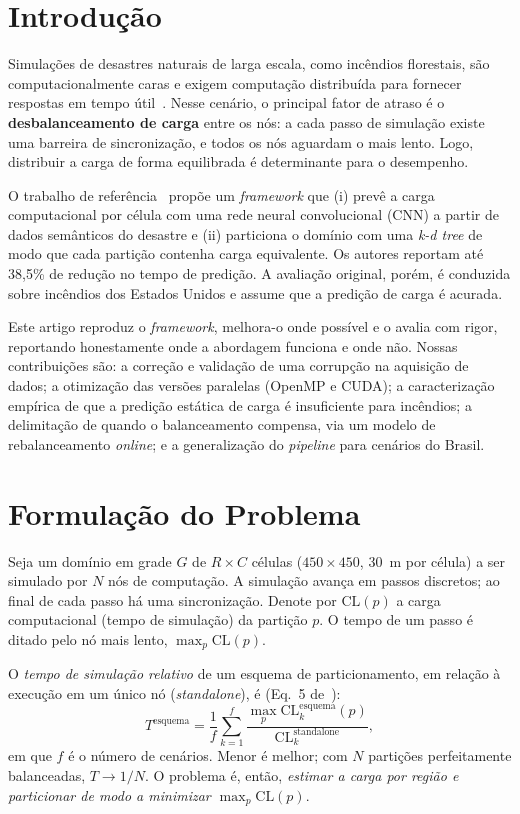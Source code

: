 \documentclass[12pt]{article}
\begin{document}
\section{Introdução}

Simulações de desastres naturais de larga escala, como incêndios florestais, são
computacionalmente caras e exigem computação distribuída para fornecer respostas
em tempo útil~\cite{kwon:22}. Nesse cenário, o principal fator de atraso é o
\textbf{desbalanceamento de carga} entre os nós: a cada passo de simulação existe
uma barreira de sincronização, e todos os nós aguardam o mais lento. Logo,
distribuir a carga de forma equilibrada é determinante para o desempenho.

O trabalho de referência~\cite{kwon:22} propõe um \textit{framework} que (i) prevê
a carga computacional por célula com uma rede neural convolucional (CNN) a partir
de dados semânticos do desastre e (ii) particiona o domínio com uma \textit{k-d
tree} de modo que cada partição contenha carga equivalente. Os autores reportam
até 38,5\% de redução no tempo de predição. A avaliação original, porém, é
conduzida sobre incêndios dos Estados Unidos e assume que a predição de carga é
acurada.

Este artigo reproduz o \textit{framework}, melhora-o onde possível e o avalia com
rigor, reportando honestamente onde a abordagem funciona e onde não. Nossas
contribuições são: a correção e validação de uma corrupção na aquisição de dados;
a otimização das versões paralelas (OpenMP e CUDA); a caracterização empírica de
que a predição estática de carga é insuficiente para incêndios; a delimitação de
quando o balanceamento compensa, via um modelo de rebalanceamento \textit{online};
e a generalização do \textit{pipeline} para cenários do Brasil.

\section{Formulação do Problema}

Seja um domínio em grade $G$ de $R \times C$ células ($450 \times 450$, $30$~m por
célula) a ser simulado por $N$ nós de computação. A simulação avança em passos
discretos; ao final de cada passo há uma sincronização. Denote por
$\mathrm{CL}(p)$ a carga computacional (tempo de simulação) da partição $p$. O
tempo de um passo é ditado pelo nó mais lento, $\max_p \mathrm{CL}(p)$.

O \textit{tempo de simulação relativo} de um esquema de particionamento, em relação
à execução em um único nó (\textit{standalone}), é (Eq.~5 de~\cite{kwon:22}):
\begin{equation}
  T^{\text{esquema}} = \frac{1}{f}\sum_{k=1}^{f}
  \frac{\max_p \mathrm{CL}^{\text{esquema}}_k(p)}{\mathrm{CL}^{\text{standalone}}_k},
  \label{eq:reltime}
\end{equation}
em que $f$ é o número de cenários. Menor é melhor; com $N$ partições perfeitamente
balanceadas, $T \to 1/N$. O problema é, então, \emph{estimar a carga por região e
particionar de modo a minimizar $\max_p \mathrm{CL}(p)$}.
\end{document}
